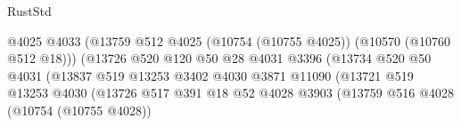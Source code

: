 \begin{lexlean}{RustStd}
\begin{coremodule}
                                                      @4025
                                                      @4033
                                                      (@13759
                                                        @512
                                                        @4025
                                                        (@10754 (@10755 @4025))
                                                        (@10570 (@10760 @512 @18)))
                                                      (@13726
                                                        @520
                                                        @120
                                                        @50
                                                        @28
                                                        @4031
                                                        @3396
                                                        (@13734
                                                          @520
                                                          @50
                                                          @4031
                                                          (@13837
                                                            @519
                                                            @13253
                                                            @3402
                                                            @4030
                                                            @3871
                                                            @11090
                                                            (@13721
                                                              @519
                                                              @13253
                                                              @4030
                                                              (@13726
                                                                @517
                                                                @391
                                                                @18
                                                                @52
                                                                @4028
                                                                @3903
                                                                (@13759
                                                                  @516
                                                                  @4028
                                                                  (@10754 (@10755 @4028))

\end{coremodule}
\end{lexlean}
